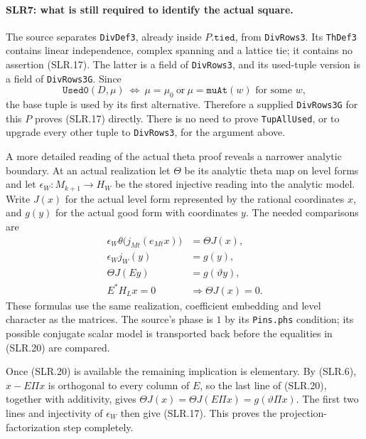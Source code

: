 \paragraph{SLR7: what is still required to identify the actual square.}
\label{claim:SLR7}
The source separates \texttt{DivDef3}, already inside $P.\texttt{tied}$,
from \texttt{DivRows3}.  Its \texttt{ThDef3} contains linear
independence, complex spanning and a lattice tie; it contains no
assertion (SLR.17).  The latter is a field of \texttt{DivRows3}, and
its used-tuple version is a field of \texttt{DivRows3G}.  Since
\[
 \texttt{Used0}(D,\mu)\ \Longleftrightarrow\
       \mu=\mu_0\ \text{or}\ \mu=\texttt{muAt}(w)\text{ for some }w,
                                                               \tag{SLR.19}
\]
the base tuple is used by its first alternative.  Therefore a supplied
\texttt{DivRows3G} for this $P$ proves (SLR.17) directly.  There is no
need to prove \texttt{TupAllUsed}, or to upgrade every other tuple to
\texttt{DivRows3}, for the argument above.

A more detailed reading of the actual theta proof reveals a narrower
analytic boundary.  At an actual realization let $\Theta$ be its
analytic theta map on level forms and let $\epsilon_W:M_{k+1}\to H_W$
be the stored injective reading into the analytic model.  Write
$J(x)$ for the actual level form represented by the rational
coordinates $x$, and $g(y)$ for the actual good form with coordinates
$y$.  The needed comparisons are
\[
 \begin{split}
 \epsilon_W\theta\bigl(j_{Mt}(e_{Mt}x)\bigr)&=\Theta J(x),\\
 \epsilon_W j_W(y)&=g(y),\\
 \Theta J(Ey)&=g(\vartheta y),\\
 E^*H_Lx=0&\Longrightarrow\Theta J(x)=0.
 \end{split}                                             \tag{SLR.20}
\]
These formulas use the same realization, coefficient embedding and
level character as the matrices.  The source's phase is $1$ by its
\texttt{Pins.phs} condition; its possible conjugate scalar model is
transported back before the equalities in (SLR.20) are compared.

Once (SLR.20) is available the remaining implication is elementary.
By (SLR.6), $x-E\Pi x$ is orthogonal to every column of $E$, so the
last line of (SLR.20), together with additivity, gives
$\Theta J(x)=\Theta J(E\Pi x)=g(\vartheta\Pi x)$.
The first two lines and injectivity of $\epsilon_W$ then give
(SLR.17).  This proves the projection-factorization step completely.

